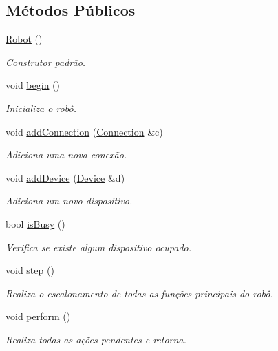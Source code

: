 \subsection*{Métodos Públicos}
\begin{DoxyCompactItemize}
\item 
\hyperlink{classRobot_a4fc7c70ae20623f05e06f2ecb388b6c4}{Robot} ()
\begin{DoxyCompactList}\small\item\em Construtor padrão. \end{DoxyCompactList}\item 
void \hyperlink{classRobot_a6c7ee2437ae5427a19f2de4903ca0df9}{begin} ()
\begin{DoxyCompactList}\small\item\em Inicializa o robô. \end{DoxyCompactList}\item 
void \hyperlink{classRobot_af59eb38f118092bd3369876a2aaac2d1}{add\-Connection} (\hyperlink{classConnection}{Connection} \&c)
\begin{DoxyCompactList}\small\item\em Adiciona uma nova conexão. \end{DoxyCompactList}\item 
void \hyperlink{classRobot_a3a965a448c5d9d95ecb2bf6c5ee668b9}{add\-Device} (\hyperlink{classDevice}{Device} \&d)
\begin{DoxyCompactList}\small\item\em Adiciona um novo dispositivo. \end{DoxyCompactList}\item 
bool \hyperlink{classRobot_a1c344a898d9da75010438fd78d3827b2}{is\-Busy} ()
\begin{DoxyCompactList}\small\item\em Verifica se existe algum dispositivo ocupado. \end{DoxyCompactList}\item 
void \hyperlink{classRobot_aa50d73cd1109a70133af442674ed3a1a}{step} ()
\begin{DoxyCompactList}\small\item\em Realiza o escalonamento de todas as funções principais do robô. \end{DoxyCompactList}\item 
void \hyperlink{classRobot_aaad55dfa6b3daedd9670bec46dc079f1}{perform} ()
\begin{DoxyCompactList}\small\item\em Realiza todas as ações pendentes e retorna. \end{DoxyCompactList}\item 

\end{DoxyCompactItemize}

